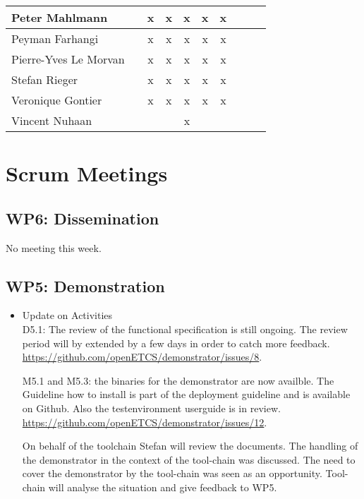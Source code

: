\documentclass[a4paper, 11pt]{article}
\begin{document}
\begin{tabular}{|l|c|c|c||c|c|c||c|c|c|}
Peter Mahlmann       &   & x & x & x & x & x \\\hline
Peyman Farhangi      &   & x & x & x & x & x \\\hline
Pierre-Yves Le Morvan&   & x & x & x & x & x \\\hline
Stefan Rieger        &   & x & x & x & x & x \\\hline
Veronique Gontier    &   & x & x & x & x & x \\\hline
Vincent Nuhaan       &   &   &   & x &   &   \\\hline
\end{tabular}


\section{Scrum Meetings}

\subsection{WP6: Dissemination}

No meeting this week.

\subsection{WP5: Demonstration}
\begin{itemize}
\item Update on Activities\\

D5.1: The review of the functional specification is still ongoing. The review period will by extended by a few days in order to catch more feedback. \url{https://github.com/openETCS/demonstrator/issues/8}.

M5.1 and M5.3: the binaries for the demonstrator are now availble. The Guideline how to install is part of the deployment guideline and is available on Github. Also the testenvironment userguide is in review. \url{https://github.com/openETCS/demonstrator/issues/12}.

On behalf of the toolchain Stefan will review the documents. The handling of the demonstrator in the context of the tool-chain was discussed. The need to cover the demonstrator by the tool-chain was seen as an opportunity. Tool-chain will analyse the situation and give feedback to WP5.

\end{itemize}
\end{document}
